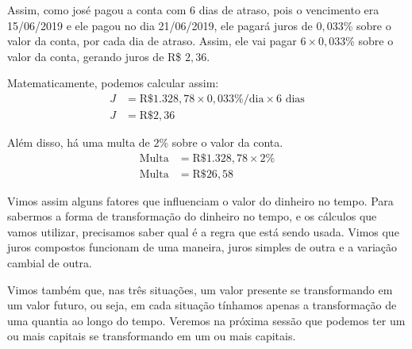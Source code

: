 Assim, como josé pagou a conta com 6 dias de atraso, pois o vencimento era 15/06/2019 e ele pagou no dia 21/06/2019, ele pagará juros de $0{,}033$\% sobre o valor da conta, por cada dia de atraso. Assim, ele vai pagar $6\times0{,}033$\% sobre o valor da conta, gerando juros de R\$ $2{,}36$.

Matematicamente, podemos calcular assim:
\begin{align*}
J&=\text{R\$}1.328{,}78\times0{,}033\%/\text{dia}\times6\text{ dias}\\
J&=\text{R\$}2{,}36
\end{align*}

Além disso, há uma multa de $2$\% sobre o valor da conta.
\begin{align*}
\text{Multa}&=\text{R\$}1.328{,}78\times2\%\\
\text{Multa}&=\text{R\$}26{,}58
\end{align*}

Vimos assim alguns fatores que influenciam o valor do dinheiro no tempo. Para sabermos a forma de transformação do dinheiro no tempo, e os cálculos que vamos utilizar, precisamos saber qual é a regra que está sendo usada. Vimos que juros compostos funcionam de uma maneira, juros simples de outra e a variação cambial de outra.

Vimos também que, nas três situações, um valor presente se transformando em um valor futuro, ou seja, em cada situação tínhamos apenas a transformação de uma quantia ao longo do tempo. Veremos na próxima sessão que podemos ter um ou mais capitais se transformando em um ou mais capitais.

